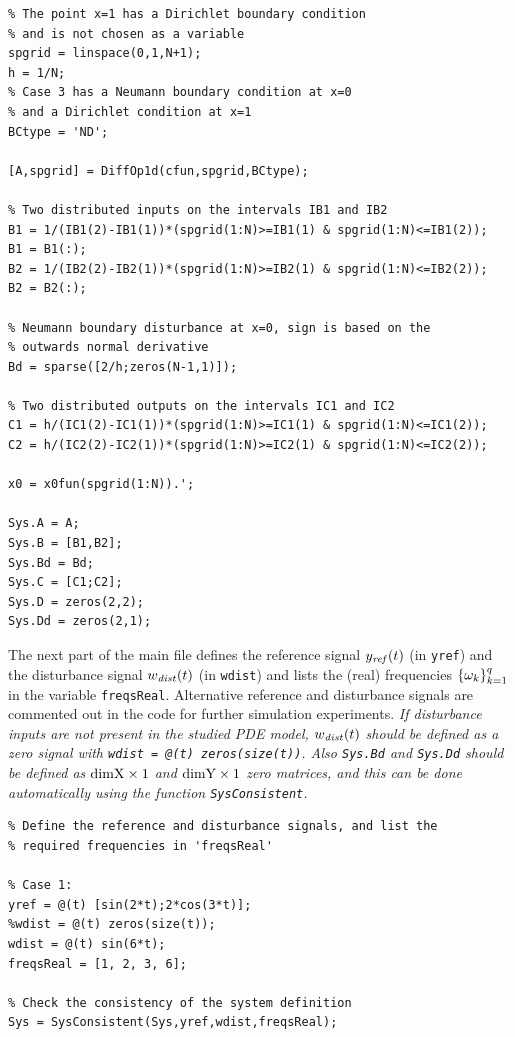 \documentclass[11pt, a4paper]{amsart}
\theoremstyle{definition}
\numberwithin{equation}{section}
\newcommand{\yref}{y_{\mbox{\scriptsize\textit{ref}}}}
\newcommand{\wdist}{w_{\mbox{\scriptsize\textit{dist}}}}
\begin{document}
\begin{lstlisting}
% The point x=1 has a Dirichlet boundary condition
% and is not chosen as a variable
spgrid = linspace(0,1,N+1);
h = 1/N;
% Case 3 has a Neumann boundary condition at x=0
% and a Dirichlet condition at x=1
BCtype = 'ND';

[A,spgrid] = DiffOp1d(cfun,spgrid,BCtype);

% Two distributed inputs on the intervals IB1 and IB2
B1 = 1/(IB1(2)-IB1(1))*(spgrid(1:N)>=IB1(1) & spgrid(1:N)<=IB1(2));
B1 = B1(:);
B2 = 1/(IB2(2)-IB2(1))*(spgrid(1:N)>=IB2(1) & spgrid(1:N)<=IB2(2));
B2 = B2(:);

% Neumann boundary disturbance at x=0, sign is based on the
% outwards normal derivative
Bd = sparse([2/h;zeros(N-1,1)]); 

% Two distributed outputs on the intervals IC1 and IC2
C1 = h/(IC1(2)-IC1(1))*(spgrid(1:N)>=IC1(1) & spgrid(1:N)<=IC1(2));
C2 = h/(IC2(2)-IC2(1))*(spgrid(1:N)>=IC2(1) & spgrid(1:N)<=IC2(2));

x0 = x0fun(spgrid(1:N)).';

Sys.A = A;
Sys.B = [B1,B2];
Sys.Bd = Bd;
Sys.C = [C1;C2];
Sys.D = zeros(2,2);
Sys.Dd = zeros(2,1);
  \end{lstlisting}

The next part of the main file defines the reference signal $\yref(t)$ (in \texttt{yref}) and the disturbance signal $\wdist(t)$ (in \texttt{wdist}) and lists the (real) frequencies $\{\omega_k\}_{k=1}^q$ in the variable \texttt{freqsReal}. Alternative reference and disturbance signals are commented out in the code for further simulation experiments.
\emph{If disturbance inputs are not present in the studied PDE model, $\wdist(t)$ should be defined as a zero signal with \textup{\texttt{wdist = @(t) zeros(size(t))}}. Also \textup{\texttt{Sys.Bd}} and \textup{\texttt{Sys.Dd}} should be defined as $\textup{dimX}\times 1$ and $\textup{dimY}\times 1$ zero matrices, and this can be done automatically using the function \textup{\texttt{SysConsistent}}.}

\begin{lstlisting}
% Define the reference and disturbance signals, and list the
% required frequencies in 'freqsReal'

% Case 1:
yref = @(t) [sin(2*t);2*cos(3*t)];
%wdist = @(t) zeros(size(t));
wdist = @(t) sin(6*t);
freqsReal = [1, 2, 3, 6];

% Check the consistency of the system definition
Sys = SysConsistent(Sys,yref,wdist,freqsReal);
\end{lstlisting}
\end{document}
